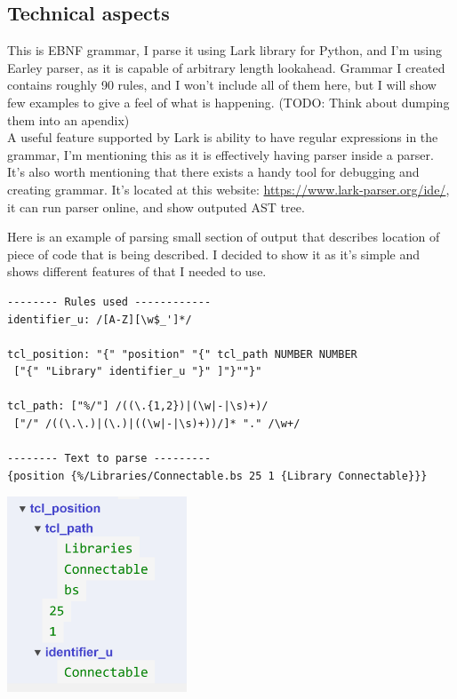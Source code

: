 \documentclass[12pt]{report}
\begin{document}
\subsection{Technical aspects}
This is EBNF grammar, I parse it using Lark library for Python, and I'm using Earley parser, as it is capable of arbitrary length lookahead. Grammar I created contains roughly 90 rules, and I won't include all of them here, but I will show few examples to give a feel of what is happening. (TODO: Think about dumping them into an apendix) 
\\
A useful feature supported by Lark is ability to have regular expressions in the grammar, I'm mentioning this as it is effectively having parser inside a parser. It's also worth mentioning that there exists a handy tool for debugging and creating grammar. It's located at this website: \href{https://www.lark-parser.org/ide/}{https://www.lark-parser.org/ide/}, it can run parser online, and show outputed AST tree.
\begin{tcolorbox}[title = Parsing position TODO maybe find a better example with shorter line]
    Here is an example of parsing small section of output that describes location of piece of code that is being described. I decided to show it as it's simple and shows different features of that I needed to use.
    \begin{verbatim}
-------- Rules used ------------
identifier_u: /[A-Z][\w$_']*/

tcl_position: "{" "position" "{" tcl_path NUMBER NUMBER 
 ["{" "Library" identifier_u "}" ]"}""}"

tcl_path: ["%/"] /((\.{1,2})|(\w|-|\s)+)/ 
 ["/" /((\.\.)|(\.)|((\w|-|\s)+))/]* "." /\w+/

-------- Text to parse ---------
{position {%/Libraries/Connectable.bs 25 1 {Library Connectable}}}
    \end{verbatim}
    \includegraphics[width=0.4\textwidth]{images/TCLPath.png}
\end{tcolorbox}
\end{document}
